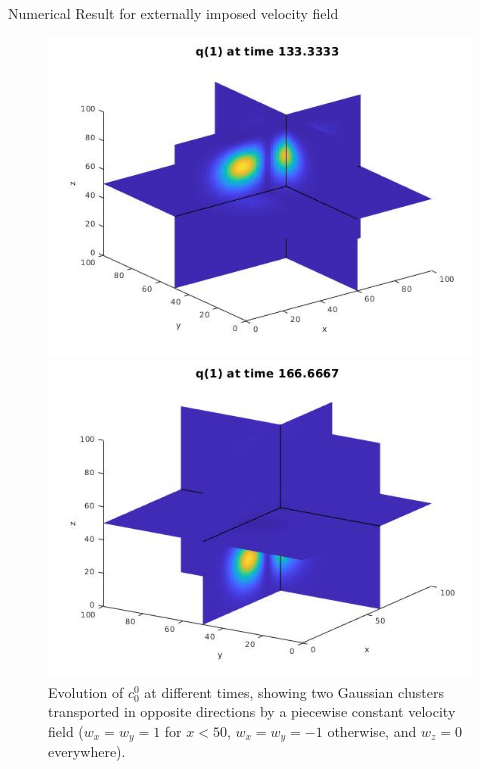\begin{frame}{Numerical Result for externally imposed velocity field}
\begin{figure}[H]
\begin{minipage}{0.4\textwidth}
    		\end{minipage}
    	\end{figure}
    	\begin{figure}[H]
    		\centering
    		\begin{minipage}{0.4\textwidth}
    			\includegraphics[scale=0.21]{Bilder_3D/2Glocken_wxi_wyj_wzi_2Cluster_t=133}
    		\end{minipage}
    		\hfill 
    		\begin{minipage}{0.4\textwidth}
    			\includegraphics[scale=0.21]{Bilder_3D/2Glocken_wxi_wyj_wzi_2Cluster_t=166}
    		\end{minipage}
    		\caption{Evolution of $c^0_0$ at different times, showing two Gaussian clusters transported in opposite directions by a piecewise constant velocity field ($w_x=w_y=1$ for $x<50$, $w_x=w_y=-1$ otherwise, and $w_z=0$ everywhere).}
    	\end{figure}
    \end{frame}
    
